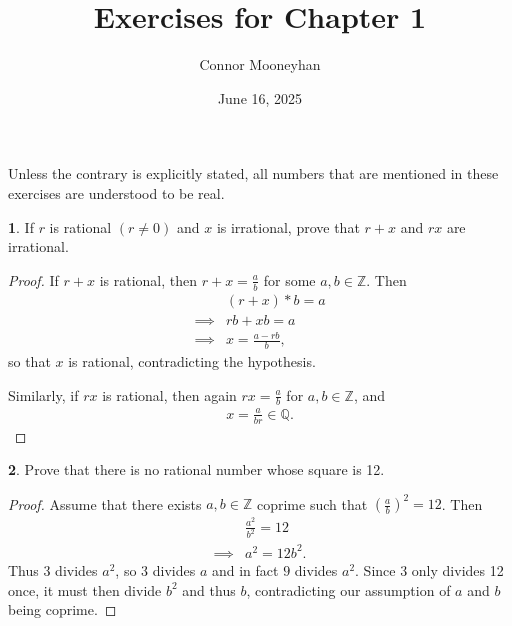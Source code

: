 \documentclass[12pt]{article}
\title{Exercises for Chapter 1}
\author{Connor Mooneyhan}
\date{June 16, 2025}
\theoremstyle{definition}
\newtheorem{ex}{}
\begin{document}
\maketitle

Unless the contrary is explicitly stated, all numbers that are mentioned in these exercises are understood to be real.
\begin{ex}
	If $r$ is rational $(r \neq 0)$ and $x$ is irrational, prove that $r + x$ and $rx$ are irrational.
\end{ex}
\begin{proof}
	If $r + x$ is rational, then $r + x = \frac{a}{b}$ for some $a, b \in \mathbb{Z}$.
	Then \begin{align*}
		         & (r + x)*b = a          \\
		\implies & rb + xb = a            \\
		\implies & x = \frac{a - rb }{b},
	\end{align*}
	so that $x$ is rational, contradicting the hypothesis.

	Similarly, if $rx$ is rational, then again $rx = \frac{a}{b}$ for $a, b \in \mathbb{Z}$, and \begin{align*}
		x = \frac{a}{br} \in \mathbb{Q}.
	\end{align*}
\end{proof}

\begin{ex}
	Prove that there is no rational number whose square is 12.
\end{ex}
\begin{proof}
	Assume that there exists $a, b \in \mathbb{Z}$ coprime such that $\left(\frac{a}{b}\right)^2 = 12$.
	Then \begin{align*}
		         & \frac{a^2}{b^2} = 12 \\
		\implies & a^2 = 12b^2.
	\end{align*}
	Thus 3 divides $a^2$, so 3 divides $a$ and in fact $9$ divides $a^2$.
	Since 3 only divides 12 once, it must then divide $b^2$ and thus $b$, contradicting our assumption of $a$ and $b$ being coprime.
\end{proof}
\end{document}
